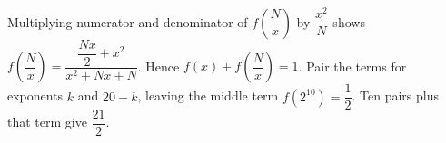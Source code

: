 Multiplying numerator and denominator of $f(\dfrac{N}{x})$ by $\dfrac{x^2}{N}$ shows $f(\dfrac{N}{x})=\dfrac{\dfrac{Nx}{2}+x^2}{x^2+Nx+N}$. Hence $f(x)+f(\dfrac{N}{x})=1$. Pair the terms for exponents $k$ and $20-k$, leaving the middle term $f(2^{10})=\dfrac{1}{2}$. Ten pairs plus that term give $\boxed{\dfrac{21}{2}}$.
